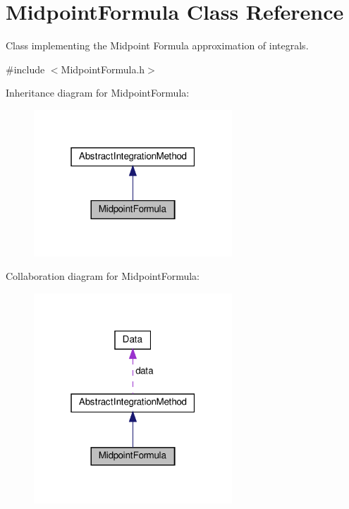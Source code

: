 \hypertarget{class_midpoint_formula}{}\section{Midpoint\+Formula Class Reference}
\label{class_midpoint_formula}


Class implementing the Midpoint Formula approximation of integrals.  




{\ttfamily \#include $<$Midpoint\+Formula.\+h$>$}



Inheritance diagram for Midpoint\+Formula\+:\nopagebreak
\begin{figure}[H]
\begin{center}
\leavevmode
\includegraphics[width=211pt]{class_midpoint_formula__inherit__graph}
\end{center}
\end{figure}


Collaboration diagram for Midpoint\+Formula\+:\nopagebreak
\begin{figure}[H]
\begin{center}
\leavevmode
\includegraphics[width=211pt]{class_midpoint_formula__coll__graph}
\end{center}
\end{figure}
